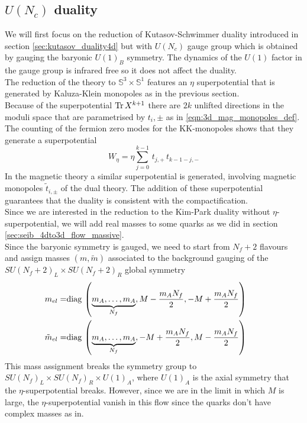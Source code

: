 \subsection{$U(N_c)$ duality}
We will first focus on the reduction of Kutasov-Schwimmer duality introduced in section \ref{sec:kutasov_duality4d} but with $U(N_c)$ gauge group which is obtained by gauging the baryonic $U(1)_B$ symmetry.
The dynamics of the $U(1)$ factor in the gauge group is infrared free so it does not affect the duality.\\
The reduction of the theory to $\mathbb{S}^3 \times \mathbb{S}^1$ features an $\eta$ superpotential that is generated by Kaluza-Klein monopoles as in the previous section.\\
Because of the superpotential $\mathrm{Tr } \,{X^{k+1}} $ there are $2k $ unlifted directions in the moduli space that are parametrised by $t_i,\pm$ as in \eqref{eqn:3d_mag_monopoles_def}. 
The counting of the fermion zero modes for the KK-monopoles shows that they generate a superpotential \cite{Nii:2014jsa}
\begin{equation}
W_{\eta} = \eta \sum_{j=0}^{k-1} \, t_{j,+} \, t_{k-1-j,-} 
\end{equation}
In the magnetic theory a similar superpotential is generated, involving magnetic monopoles $\tilde{t}_{i,\pm}$ of the dual theory.
The addition of these superpotential guarantees that the duality is consistent with the compactification.\\
Since we are interested in the reduction to the Kim-Park duality without $\eta$-superpotential, we will add real masses to some quarks as we did in section \ref{sec:seib_4dto3d_flow_massive}.\\
Since the baryonic symmetry is gauged, we need to start from $N_f +2 $ flavours and assign masses $(m,\tilde{m})$ associated to the background gauging of the $SU(N_f+2)_L \times SU(N_f +2 )_R$ global symmetry
\begin{align}
 m_{el} = & \hbox{diag\,} \left( \underbrace{m_A,\dotsc,m_A}_{N_f}, M - \frac{m_A N_f}{2},-M +\frac{m_A N_f}{2}\right) \qquad \\
 \tilde{m}_{el} = & \hbox{diag\,} \left( 
 \underbrace{
 m_A , \dotsc, m_A
 }_{N_f}
 ,-M +\frac{m_A N_f}{2}, M - \frac{m_A N_f}{2} \right)
\end{align}
This mass assignment breaks the symmetry group to $SU(N_f)_L \times SU(N_f)_R \times U(1)_A $, where $U(1)_A$ is the axial symmetry that the $\eta$-superpotential breaks. 
However, since we are in the limit in which $M $ is large, the $\eta$-superpotential vanish in this flow since the quarks don't have complex masses as in\cite{Aharony:2013dha}.
